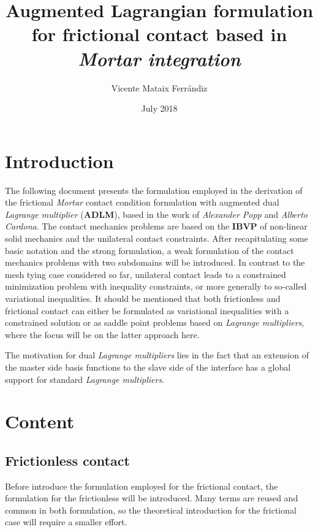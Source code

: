 \documentclass[a4paper,10pt]{article} %
\title{Augmented Lagrangian formulation for frictional contact based in \em{Mortar} integration}
\author{Vicente Mataix Ferr\'andiz}
\date{July 2018}
\begin{document}
\maketitle

\section{Introduction}

The following document presents the formulation employed in the derivation of the frictional \textit{Mortar} contact condition formulation with augmented dual \textit{Lagrange multiplier} (\textbf{ADLM}), based in the work of \textit{Alexander Popp}\cite{popp1,popp2} and \textit{Alberto Cardona}\cite{cardona1,cardona2}. The contact mechanics problems are based on the \textbf{IBVP} of non-linear solid mechanics and the unilateral contact constraints. After recapitulating some basic notation and the strong formulation, a weak formulation of the contact mechanics problems with two subdomains will be introduced.  In contrast to the mesh tying case considered so far, unilateral contact leads to a constrained minimization problem with inequality constraints, or more generally to so-called variational inequalities. It should be mentioned that both frictionless and frictional contact can either be formulated as variational inequalities with
a constrained solution or as saddle point problems based on \textit{Lagrange multipliers}, where the focus will be on the latter approach here.

The motivation for dual \textit{Lagrange multipliers}\cite{wohlmuth} lies in the fact that an extension of the master side basis functions to the slave side of the interface has a global support for standard \textit{Lagrange multipliers}.

\section{Content}

\subsection{Frictionless contact}

Before introduce the formulation employed for the frictional contact, the formulation for the frictionless will be introduced. Many terms are reused and common in both formulation, so the theoretical introduction for the frictional case will require a smaller effort.
\end{document}
